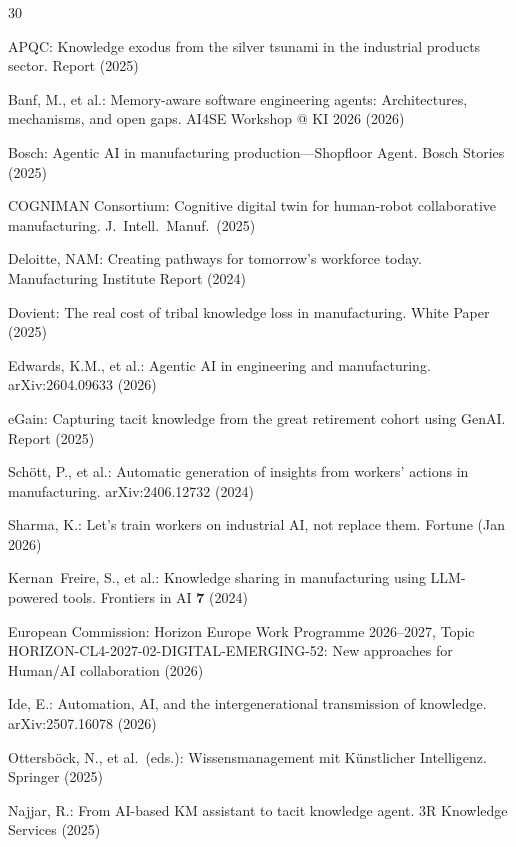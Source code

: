 \documentclass[]{ceurart}
\begin{document}
\begin{thebibliography}{30}
\small

 APQC: Knowledge exodus from the silver tsunami in
  the industrial products sector. Report (2025)

 Banf, M., et al.: Memory-aware software
  engineering agents: Architectures, mechanisms, and open gaps. AI4SE
  Workshop @ KI 2026 (2026)

 Bosch: Agentic AI in manufacturing
  production---Shopfloor Agent. Bosch Stories (2025)

 COGNIMAN Consortium: Cognitive digital twin for
  human-robot collaborative manufacturing. J.\ Intell.\ Manuf.\ (2025)

 Deloitte, NAM: Creating pathways for tomorrow's
  workforce today. Manufacturing Institute Report (2024)

 Dovient: The real cost of tribal knowledge loss
  in manufacturing. White Paper (2025)

 Edwards, K.M., et al.: Agentic AI in engineering
  and manufacturing. arXiv:2604.09633 (2026)

 eGain: Capturing tacit knowledge from the great
  retirement cohort using GenAI. Report (2025)

 Sch\"ott, P., et al.: Automatic generation
  of insights from workers' actions in manufacturing.
  arXiv:2406.12732 (2024)

 Sharma, K.: Let's train workers on industrial AI,
  not replace them. Fortune (Jan 2026)

 Kernan~Freire, S., et al.: Knowledge sharing in
  manufacturing using LLM-powered tools. Frontiers in AI \textbf{7}
  (2024)

 European Commission: Horizon Europe Work Programme
  2026--2027, Topic HORIZON-CL4-2027-02-DIGITAL-EMERGING-52: New
  approaches for Human/AI collaboration (2026)

 Ide, E.: Automation, AI, and the intergenerational
  transmission of knowledge. arXiv:2507.16078 (2026)

 Ottersb\"ock, N., et al.\ (eds.):
  Wissensmanagement mit K\"unstlicher Intelligenz. Springer (2025)

 Najjar, R.: From AI-based KM assistant to tacit
  knowledge agent. 3R Knowledge Services (2025)


\end{thebibliography}
\end{document}
